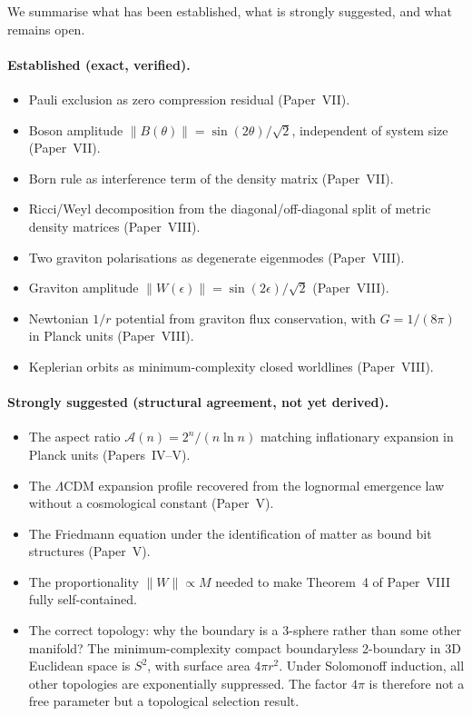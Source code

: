 \documentclass[11pt]{article}
\begin{document}
We summarise what has been established, what is strongly suggested,
and what remains open.

\paragraph{Established (exact, verified).}
\begin{itemize}
  \item Pauli exclusion as zero compression residual (Paper~VII).
  \item Boson amplitude $\|B(\theta)\| = \sin(2\theta)/\sqrt{2}$,
        independent of system size (Paper~VII).
  \item Born rule as interference term of the density matrix (Paper~VII).
  \item Ricci/Weyl decomposition from the diagonal/off-diagonal split
        of metric density matrices (Paper~VIII).
  \item Two graviton polarisations as degenerate eigenmodes
        (Paper~VIII).
  \item Graviton amplitude $\|W(\epsilon)\| = \sin(2\epsilon)/\sqrt{2}$
        (Paper~VIII).
  \item Newtonian $1/r$ potential from graviton flux conservation,
        with $G = 1/(8\pi)$ in Planck units (Paper~VIII).
  \item Keplerian orbits as minimum-complexity closed worldlines
        (Paper~VIII).
\end{itemize}

\paragraph{Strongly suggested (structural agreement, not yet derived).}
\begin{itemize}
  \item The aspect ratio $\mathcal{A}(n) = 2^n/(n\ln n)$ matching
        inflationary expansion in Planck units (Papers~IV--V).
  \item The $\Lambda$CDM expansion profile recovered from the lognormal
        emergence law without a cosmological constant (Paper~V).
  \item The Friedmann equation under the identification of matter as
        bound bit structures (Paper~V).
  \item The proportionality $\|W\| \propto M$ needed to make
        Theorem~4 of Paper~VIII fully self-contained.
  \item The correct topology: why the boundary is a 3-sphere rather than some other manifold?
        The minimum-complexity compact boundaryless 2-boundary in 3D Euclidean space is $S^2$,
        with surface area $4\pi r^2$. Under Solomonoff induction, all other topologies are exponentially suppressed.
        The factor $4\pi$ is therefore not a free parameter but a topological selection result.
\end{itemize}
\end{document}
